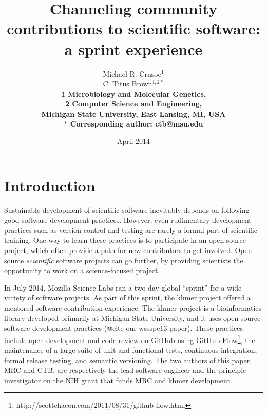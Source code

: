 \documentclass[12pt]{article}
\date{April 2014}
\title{Channeling community contributions to scientific software: a sprint experience}
\author{Michael R. Crusoe$^{1}$\\
C. Titus Brown$^{1,2\ast}$\\
\small \bf{1} Microbiology and Molecular Genetics,\\
\small \bf{2} Computer Science and Engineering,\\
\small Michigan State University, East Lansing, MI, USA\\
\small $\ast$ Corresponding author: ctb@msu.edu}
\begin{document}
\maketitle
\thispagestyle{firststyle}


\setlength{\parindent}{0pt}
\setlength{\parindent}{0pt}
\setlength{\parskip}{0.70ex}

\section{Introduction}

Sustainable development of scientific software inevitably depends on
following good software development practices.  However, even
rudimentary development practices such as version control and testing
are rarely a formal part of scientific training.  One way to learn
these practices is to participate in an open source project, which
often provide a path for new contributors to get involved.  Open
source {\em scientific} software projects can go further, by providing
scientists the opportunity to work on a science-focused project.

In July 2014, Mozilla Science Labs ran a two-day global ``sprint'' for
a wide variety of software projects. As part of this sprint, the khmer
project offered a mentored software contribution experience.  The
khmer project is a bioinformatics library developed primarily at
Michigan State University, and it uses open source software
development practices (@cite our wssspe13 paper).  These practices
include open development and code review on GitHub using GitHub
Flow\footnote{http://scottchacon.com/2011/08/31/github-flow.html}, the
maintenance of a large suite of unit and functional tests, continuous
integration, formal release testing, and semantic versioning.  The two
authors of this paper, MRC and CTB, are respectively the lead software
engineer and the principle investigator on the NIH grant that funds
MRC and khmer development.
\end{document}
